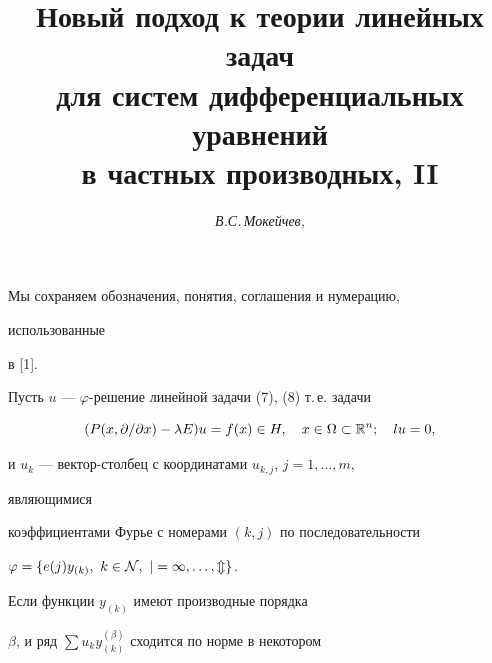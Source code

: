  


\author{\it В.С.\,Мокейчев, }  




\title{Новый подход к теории линейных задач\\  


для систем дифференциальных уравнений\\  


в частных производных, II}  


  


\date{}  




\pagestyle{plain} %


  




\maketitle  


\label{begin}  


 


Мы сохраняем обозначения, понятия, соглашения и нумерацию, 


использованные 


в [1]. 


 


Пусть $u$ --- $\varphi$-решение линейной задачи (7), (8) т.\,е. задачи 


$$ 


(P(x,\partial/\partial x)-\lambda E)u=f(x)\in H,\quad 


x\in\Omega\subset\Bbb R^n;\quad l u=0, 


$$ 


и $u_k$ --- вектор-столбец с координатами $u_{k,j}$, $j=1,\dotsc,m$, 


являющимися 


коэффициентами Фурье с номерами $(k,j)$ по последовательности 


$\varphi=\{e(j)y_{(k)},\ k\in\cal N,\ j=1,\dotsc,m\}$. 


Если функции $y_{(k)}$ имеют производные порядка  


$\beta$, и ряд $\sum u_k y_{(k)}^{(\beta)}$ сходится по норме в некотором 


